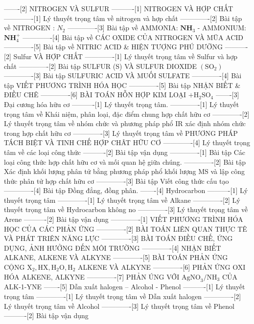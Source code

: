-------[2] NITROGEN VÀ SULFUR
----------[1] NITROGEN VÀ HỢP CHẤT
-------------[1] Lý thuyết trọng tâm về nitrogen và hợp chất
-------------[2] Bài tập về NITROGEN : $N_2$
-------------[3] Bài tập về AMMONIA: $\mathbf{N H}_3$ - AMMONIUM: $\mathbf{N H}_4^{+}$
-------------[4] Bài tập về CÁC OXIDE CỦA NITROGEN VÀ MÜA ACID
-------------[5] Bài tập về NITRIC ACID \& HIỆN TƯỢNG PHÚ DƯỠNG
----------[2] Sulfur VÀ HỢP CHẤT
-------------[1] Lý thuyết trọng tâm về Sulfur và hợp chất
-------------[2] Bài tập SULFUR (S) VÀ SULFUR DIOXIDE $\left(\mathrm{SO}_2\right)$
-------------[3] Bài tập SULFURIC ACID VÀ MUỐI SULFATE
-------------[4] Bài tập VIẾT PHƯƠNG TRÌNH HÓA HỌC
-------------[5] Bài tập NHẬN BIẾT \& ĐIỀU CHÊ
-------------[6] BÀI TOÁN HỖN HỢP KIM LOẠI $+\mathrm{H}_2 \mathrm{SO}_4$
-------[3] Đại cương hóa hữu cơ
----------[1] Lý thuyết trọng tâm.
-------------[1] Lý thuyết trọng tâm về Khái niệm, phân loại, đặc điểm chung hợp chất hữu cơ
-------------[2] Lý thuyết trọng tâm về nhóm chức và phương pháp phổ IR xác định nhóm chức trong hợp chất hữu cơ
-------------[3] Lý thuyết trọng tâm về PHƯƠNG PHÁP TÁCH BIỆT VÀ TINH CHẾ HỢP CHÂT HỮU CƠ
-------------[4] Lý thuyết trọng tâm về các loại công thức
----------[2] Bài tập vận dụng
-------------[1] Bài tập Các loại công thức hợp chất hữu cơ và mối quan hệ giữa chúng.
-------------[2] Bài tập Xác định khối lượng phân tử bằng phương pháp phổ khối lượng MS và lập công thức phân tử hợp chất hữu cơ
-------------[3] Bài tập Viết công thức cấu tạo
-------------[4] Bài tập Đồng đẳng, đồng phân.
-------[4] Hydrocarbon
----------[1] Lý thuyết trọng tâm 
-------------[1] Lý thuyết trọng tâm về Alkane
-------------[2] Lý thuyết trọng tâm về Hydrocarbon không no
-------------[3] Lý thuyết trọng tâm về Arene
----------[2] Bài tập vận dụng
-------------[1] VIẾT PHƯƠNG TRÌNH HÓA HỌC CỦA CÁC PHẢN ỨNG
-------------[2] BÀI TOÁN LIÊN QUAN THỰC TÊ VÀ PHÁT TRIÊN NĂNG LỰC
-------------[3] BÀI TOÁN ĐIỀU CHẾ, ỨNG DỤNG, ẢNH HƯỞNG ĐẾN MÔI TRƯỜNG 
-------------[4] NHẬN BIẾT ALKANE, ALKENE VÀ ALKYNE
-------------[5] BÀI TOÁN PHẢN ỨNG CỘNG $\mathrm{X}_2, \mathrm{HX}, \mathrm{H}_2 \mathrm{O}, \mathrm{H}_2$ ALKENE VÀ ALKYNE
-------------[6] PHẢN ỨNG OXI HÓA ALKENE, ALKYNE
-------------[7] PHẢN ÚNG VỚI $\mathrm{AgNO}_3 / \mathrm{NH}_3$ CỦA ALK-1-YNE
-------[5] Dẫn xuất halogen – Alcohol - Phenol
----------[1] Lý thuyết trọng tâm
-------------[1] Lý thuyết trọng tâm về Dẫn xuất halogen
-------------[2] Lý thuyết trọng tâm về Alcohol 
-------------[3] Lý thuyết trọng tâm về Phenol
----------[2] Bài tập vận dụng
